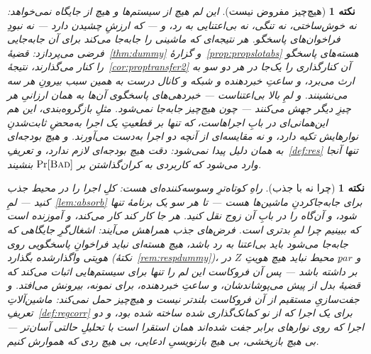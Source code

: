 \documentclass[10pt,oneside,openany]{book}
\newcommand{\pars}{\mathit{par}}
\newcommand{\op}[1]{\textnormal{\textsc{#1}}}
\newcommand{\Bad}{\op{Bad}}
\theoremstyle{accentdef}
\newtheorem{remark}[definition]{نکته}
\theoremstyle{accentplain}
\begin{document}
\begin{remark}[هیچ‌چیز مفروض نیست]\label{rem:iubfree}
این لم هیچ از سیستم‌ها و هیچ از جایگاه نمی‌خواهد: نه خوش‌ساختی، نه تنگی، نه
بی‌اعتنایی به رد، و --- که ارزشِ چشیدن دارد --- نه نبودِ فراخوان‌های پاسخگو.
هر نتیجه‌ای که ماشینی را جابه‌جا می‌کند برای آن جابه‌جایی فرضی می‌پردازد:
قضیهٔ~\ref{thm:dummy} و گزارهٔ~\ref{prop:propslotabs} هسته‌های پاسخگو را
کنار می‌گذارند، نتیجهٔ~\ref{cor:proptransfer2} آن کنارگذاری را یک‌جا در هر
دو سو به ارث می‌برد، و ساعتِ خبردهنده و شبکه و کانال درست به همین سبب بیرونِ
هر سه می‌نشینند. و لمِ بالا بی‌اعتناست --- خبردهی‌های پاسخگوی آن‌ها به همان
ارزانیِ هر چیزِ دیگر جهش می‌کنند --- چون هیچ‌چیز جابه‌جا نمی‌شود. مثلِ
بازگروه‌بندی، این هم این‌همانی‌ای در بابِ اجراهاست، که تنها بر قطعیتِ یک
اجرا به‌محضِ ثابت‌شدنِ نوارهایش تکیه دارد، و نه مقایسه‌ای از آنچه دو اجرا
به‌دست می‌آورند. و هیچ بودجه‌ای به همان دلیل پیدا نمی‌شود: دقت هیچ بودجه‌ای
لازم ندارد، و تعریفِ~\ref{def:res} تنها آنجا وارد می‌شود که کاربردی به
کران‌گذاشتن بر $\Pr[\Bad]$ بنشیند.
\end{remark}

\begin{remark}[چرا نه با جذب]\label{rem:iubabs}
راهِ کوتاه‌ترِ وسوسه‌کننده‌ای هست: کلِ اجرا را در محیط جذب کنید ---
لمِ~\ref{lem:absorb} برای جابه‌جاکردنِ ماشین‌ها هست --- تا هر سو یک برنامهٔ
تنها شود، و آن‌گاه \cite{BR06} را در بابِ آن زوج نقل کنید. هر جا کار کند
کار می‌کند، و آموزنده است که ببینیم چرا لمِ بدتری است. فرض‌های جذب همراهش
می‌آیند: اشغال‌گرِ جایگاهی که جابه‌جا می‌شود باید بی‌اعتنا به رد باشد، هیچ
هسته‌ای نباید فراخوانِ پاسخگویی روی هویتی واگذارشده بگذارد
(نکتهٔ~\ref{rem:respdummy})، و $\pars$ِ محیط نباید هیچ هویتِ $Z$ در بر
داشته باشد --- پس آن فروکاست این لم را تنها برای سیستم‌هایی اثبات می‌کند که
قضیهٔ بدل از پیش می‌پوشاندشان، و ساعتِ خبردهنده، برای نمونه، بیرونش می‌افتد.
و جفت‌سازیِ مستقیم از آن فروکاست بلندتر نیست و هیچ‌چیز حمل نمی‌کند:
ماشین‌آلاتِ تعریفِ~\ref{def:regcorr} برای یک اجرا که از نو کمانک‌گذاری شده
ساخته شده بود، و دو اجرا که روی نوارهای برابر جفت شده‌اند همان استقرا است با
تحلیلِ حالتی آسان‌تر --- بی هیچ بازپخشی، بی هیچ بازنویسیِ ادعایی، بی هیچ ردی
که هموارش کنیم.
\end{remark}
\end{document}
